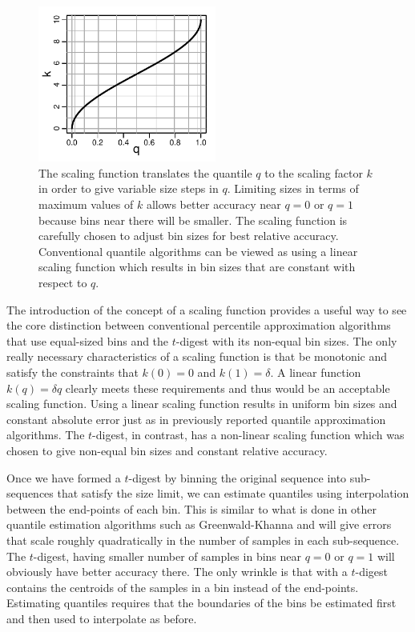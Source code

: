 \documentclass[11pt]{amsart}
\begin{document}
\begin{figure}[htbp] %
   \centering
   \includegraphics[width=2.3in]{k-q-plot.pdf} 
   \caption{The scaling function translates the quantile $q$ to the scaling factor $k$ in order to give variable size steps in $q$. Limiting sizes in terms of maximum values of $k$ allows better accuracy near $q=0$ or $q=1$ because bins near there will be smaller. The scaling function is carefully chosen to adjust bin sizes for best relative accuracy. Conventional quantile algorithms can be viewed as using a linear scaling function which results in bin sizes that are constant with respect to $q$.}
   \label{fig:k-q-plot}
\end{figure}
The introduction of the concept of a scaling function provides a useful way to see the core distinction between conventional percentile approximation algorithms that use equal-sized bins and the $t$-digest with its non-equal bin sizes. The only really necessary characteristics of a scaling function is that be monotonic and satisfy the constraints that $k(0)=0$ and $k(1)=\delta$. A linear function $k(q) = \delta q$ clearly meets these requirements and thus would be an acceptable scaling function. Using a linear scaling function results in uniform bin sizes and constant absolute error just as in previously reported quantile approximation algorithms. The $t$-digest, in contrast, has a non-linear scaling function which was chosen to give non-equal bin sizes and constant relative accuracy.

Once we have formed a $t$-digest by binning the original sequence into sub-sequences that satisfy the size limit, we can estimate quantiles using interpolation between the end-points of each bin. This is similar to what is done in other quantile estimation algorithms such as Greenwald-Khanna and will give errors that scale roughly quadratically in the number of samples in each sub-sequence. The $t$-digest, having smaller number of samples in bins near $q=0$ or $q=1$ will obviously have better accuracy there. The only wrinkle is that with a $t$-digest contains the centroids of the samples in a bin instead of the end-points. Estimating quantiles requires that the boundaries of the bins be estimated first and then used to interpolate as before. 
\end{document}
